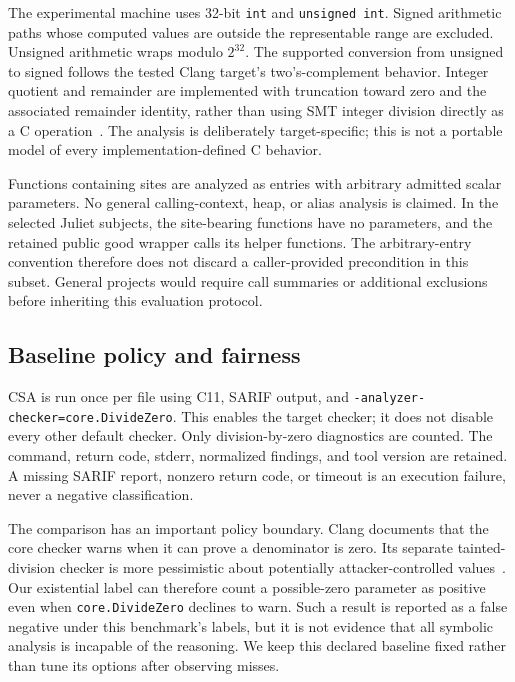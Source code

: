 \documentclass[sigconf]{acmart}
\begin{document}
The experimental machine uses 32-bit \texttt{int} and \texttt{unsigned int}.
Signed arithmetic paths whose computed values are outside the representable
range are excluded. Unsigned arithmetic wraps modulo $2^{32}$. The supported
conversion from unsigned to signed follows the tested Clang target's
two's-complement behavior. Integer quotient and remainder are implemented with
truncation toward zero and the associated remainder identity, rather than
using SMT integer division directly as a C operation~\cite{c11,z3-arithmetic}.
The analysis is deliberately target-specific; this is not a portable model of
every implementation-defined C behavior.

Functions containing sites are analyzed as entries with arbitrary admitted
scalar parameters. No general calling-context, heap, or alias analysis is
claimed. In the selected Juliet subjects, the site-bearing functions have no
parameters, and the retained public good wrapper calls its helper functions.
The arbitrary-entry convention therefore does not discard a caller-provided
precondition in this subset. General projects would require call summaries or
additional exclusions before inheriting this evaluation protocol.

\subsection{Baseline policy and fairness}
CSA is run once per file using C11, SARIF output, and
\texttt{-analyzer-checker=core.DivideZero}. This enables the target checker;
it does not disable every other default checker. Only division-by-zero
diagnostics are counted. The command, return code, stderr, normalized findings,
and tool version are retained. A missing SARIF report, nonzero return code, or
timeout is an execution failure, never a negative classification.

The comparison has an important policy boundary. Clang documents that the core
checker warns when it can prove a denominator is zero. Its separate tainted-division
checker is more pessimistic about potentially attacker-controlled
values~\cite{clang-checkers}. Our existential label can therefore count a
possible-zero parameter as positive even when \texttt{core.DivideZero} declines
to warn. Such a result is reported as a false negative under this benchmark's
labels, but it is not evidence that all symbolic analysis is incapable of the
reasoning. We keep this declared baseline fixed rather than tune its options
after observing misses.
\end{document}
